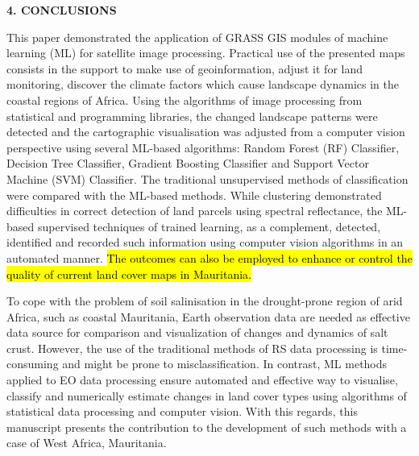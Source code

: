 \documentclass[12pt,a4paper,oneside]{article}
\def \newsection{\vspace{12pt}\textbf}
\def \newpar{\vspace{6pt}}
\begin{document}
\newsection {4. CONCLUSIONS}

\newpar This paper demonstrated the application of GRASS GIS modules of machine learning (ML) for satellite image processing. Practical use of the presented maps consists in the support to make use of geoinformation, adjust it for land monitoring, discover the climate factors which cause landscape dynamics in the coastal regions of Africa. Using the algorithms of image processing from statistical and programming libraries, the changed landscape patterns were detected and the cartographic visualisation was adjusted from a computer vision perspective using several ML-based algorithms: Random Forest (RF) Classifier, Decision Tree Classifier, Gradient Boosting Classifier and Support Vector Machine (SVM) Classifier. The traditional unsupervised methods of classification were compared with the ML-based methods. While clustering demonstrated difficulties in correct detection of land parcels using spectral reflectance, the ML-based supervised techniques of trained learning, as a complement, detected, identified and recorded such information using computer vision algorithms in an automated manner. \hl{The outcomes can also be employed to enhance or control the quality of current land cover maps in Mauritania.}

\newpar To cope with the problem of soil salinisation in the drought-prone region of arid Africa, such as coastal Mauritania, Earth observation data are needed as effective data source for comparison and visualization of changes and dynamics of salt crust. However, the use of the traditional methods of RS data processing is time-consuming and might be prone to misclassification. In contrast, ML methods applied to EO data processing ensure automated and effective way to visualise, classify and numerically estimate changes in land cover types using algorithms of statistical data processing and computer vision. With this regards, this manuscript presents the contribution to the development of such methods with a case of West Africa, Mauritania.
\end{document}
